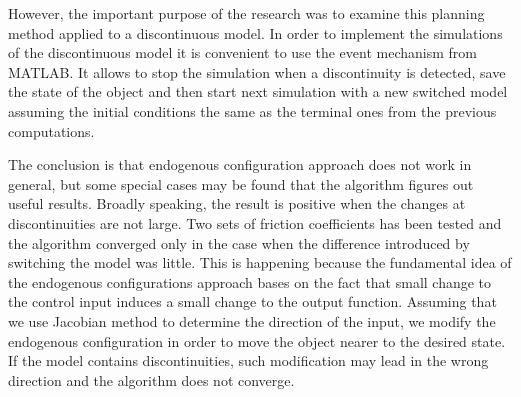 However, the important purpose of the research was to examine
this planning method applied to a discontinuous model.
In order to implement the simulations of the discontinuous model it is convenient to use the event
mechanism from MATLAB. It allows to stop the simulation when a discontinuity is detected, save the state
of the object and then start next simulation with a new switched model assuming the initial conditions
the same as the terminal ones from the previous computations.

The conclusion is that endogenous configuration approach does not work
in general, but some special cases may be found that the algorithm figures out useful results.
Broadly speaking, the result is positive when the changes at discontinuities are not
large. Two sets of friction coefficients has been tested and the algorithm
converged only in the case when the difference introduced by switching the model was little.
This is happening because the fundamental idea of the endogenous configurations approach
bases on the fact that small change to the control input induces a small change to the output function.
Assuming that we use Jacobian method to determine the direction of the input, we modify the endogenous
configuration in order to move the object nearer to the desired state. If the model contains
discontinuities, such modification may lead in the wrong direction and the algorithm does not converge.